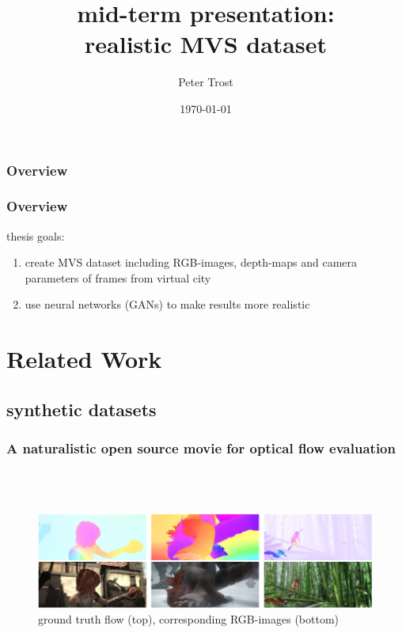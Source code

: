 \documentclass{beamer}
\title[realistic MVS dataset]{mid-term presentation:\\ realistic MVS dataset} %
\author{Peter Trost} %
\institute[Universität Tübingen] %
{
Eberhard Karls Universität Tübingen \\ %
\medskip
\textit{peter.trost@student.uni-tuebingen.de} %
}
\date{\today} %
\begin{document}
\begin{frame}
\titlepage %
\end{frame}

\begin{frame}
\frametitle{Overview} %
\tableofcontents %
\end{frame}

\begin{frame}
	\frametitle{Overview}
	thesis goals:
	\begin{enumerate}
		\item create MVS dataset including RGB-images, depth-maps and camera parameters of frames from virtual city
		\item use neural networks (GANs) to make results more realistic
	\end{enumerate}
\end{frame}
\section{Related Work}

\subsection{synthetic datasets}

\begin{frame}
\frametitle{A naturalistic open source movie for optical flow evaluation}
\cite{sintel}\\~\\
\begin{figure}
\includegraphics[width=0.8\linewidth]{../images/sintel_small.png}
\caption{ground truth flow (top), corresponding RGB-images (bottom)}
\end{figure}
\end{frame}
\end{document}
